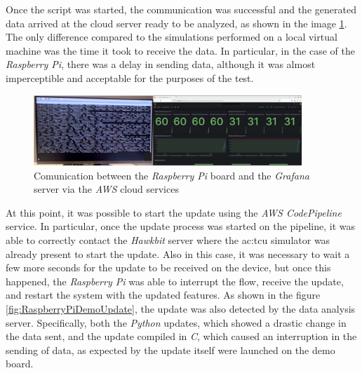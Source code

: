 Once the script was started, the communication was successful and the generated data arrived at the cloud server ready to be analyzed, as shown in the image \ref{fig:RaspberryPiDemo}. The only difference compared to the simulations performed on a local virtual machine was the time it took to receive the data. In particular, in the case of the \textit{Raspberry Pi}, there was a delay in sending data, although it was almost imperceptible and acceptable for the purposes of the test.
\begin{figure}[h]  %
    \centering
    \includegraphics[width=0.9\textwidth]{images/RaspberryPiDemo.png}  %
    \caption{Comunication between the \textit{Raspberry Pi} board and the \textit{Grafana} server via the \textit{AWS} cloud services}
    \label{fig:RaspberryPiDemo}
\end{figure}

At this point, it was possible to start the update using the \textit{AWS CodePipeline} service. In particular, once the update process was started on the pipeline, it was able to correctly contact the \textit{Hawkbit} server where the \gls{ac:tcu} simulator was already present to start the update. 
Also in this case, it was necessary to wait a few more seconds for the update to be received on the device, but once this happened, the \textit{Raspberry Pi} was able to interrupt the flow, receive the update, and restart the system with the updated features. 
As shown in the figure \ref{fig:RaspberryPiDemoUpdate}, the update was also detected by the data analysis server. Specifically, both the \textit{Python} updates, which showed a drastic change in the data sent, and the update compiled in \textit{C}, which caused an interruption in the sending of data, as expected by the update itself were launched on the demo board.

